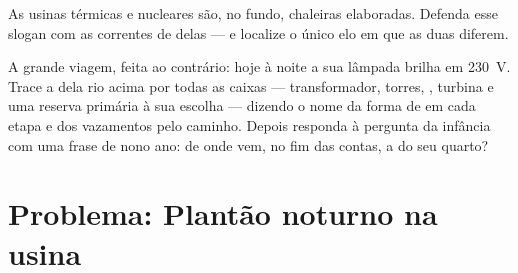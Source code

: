 \begin{exercise}[$\star\star$]\label{exo:g9:alternator:11}
As usinas térmicas e nucleares são, no fundo, chaleiras elaboradas.
Defenda esse slogan com as correntes de  delas --- e localize
o único elo em que as duas diferem.
\end{exercise}

\begin{exercise}[$\star\star\star$]\label{exo:g9:alternator:12}
A grande viagem, feita ao contrário: hoje à noite a sua lâmpada
brilha em \qty{230}{V}. Trace a  dela rio acima por todas as
caixas --- transformador, torres, , turbina e uma reserva
primária à sua escolha --- dizendo o nome da forma de  em cada
etapa e dos vazamentos pelo caminho. Depois responda à pergunta da
infância com uma frase de nono ano: de onde vem, no fim das contas, a
 do seu quarto?
\end{exercise}

\section{Problema: Plantão noturno na usina}

